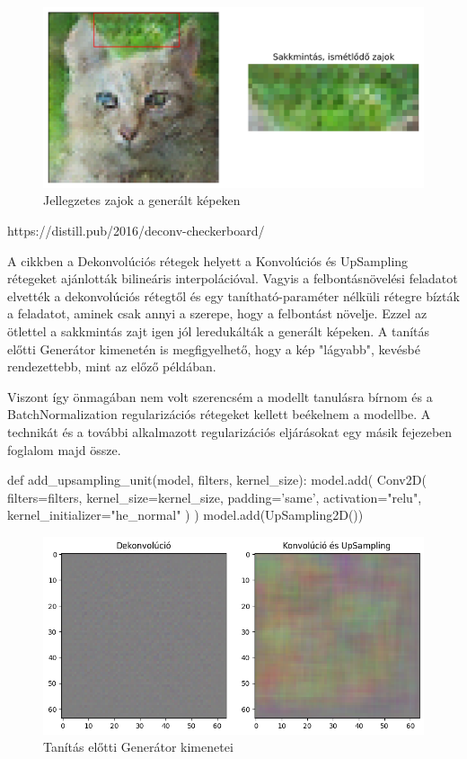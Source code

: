 
\begin{figure}[h]
\centering
\includegraphics[width=13cm]{images/chessboard-patterns.png}
\caption{Jellegzetes zajok a generált képeken}
\label{fig:chessboard-patterns}
\end{figure}

https://distill.pub/2016/deconv-checkerboard/

A cikkben a Dekonvolúciós rétegek helyett a Konvolúciós és UpSampling rétegeket ajánlották bilineáris interpolációval. Vagyis a felbontásnövelési feladatot elvették a dekonvolúciós rétegtől és egy tanítható-paraméter nélküli rétegre bízták a feladatot, aminek csak annyi a szerepe, hogy a felbontást növelje. Ezzel az ötlettel a sakkmintás zajt igen jól leredukálták a generált képeken. A tanítás előtti Generátor kimenetén is megfigyelhető, hogy a kép "lágyabb", kevésbé rendezettebb, mint az előző példában.

Viszont így önmagában nem volt szerencsém a modellt tanulásra bírnom és a BatchNormalization regularizációs rétegeket kellett beékelnem a modellbe. A technikát és a további alkalmazott regularizációs eljárásokat egy másik fejezeben foglalom majd össze.

\begin{python}
def add_upsampling_unit(model,
                        filters, kernel_size):
    model.add(
        Conv2D(
            filters=filters,
            kernel_size=kernel_size,
            padding='same',
            activation="relu",
            kernel_initializer="he_normal"
        )
    )
    model.add(UpSampling2D())
\end{python}

\begin{figure}[h]
\centering
\includegraphics[width=13cm]{images/deconv-vs-conv_upsmpl.png}
\caption{Tanítás előtti Generátor kimenetei}
\label{fig:deconv-vs-conv_upsmpl}
\end{figure}


